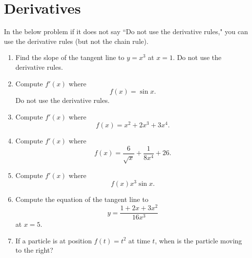 \documentclass[reqno,12pt,letterpaper]{amsart}
\theoremstyle{definition}
\numberwithin{equation}{section}
\begin{document}
\section{Derivatives}
In the below problem if it does not say ``Do not use the derivative rules," you can use the derivative rules (but not the chain rule).
\begin{enumerate}
\item Find the slope of the tangent line to $y = x^3$ at $x = 1$. Do not use the derivative rules.
\item Compute $f'(x)$ where
$$f(x) = \sin x.$$
Do not use the derivative rules.
\item Compute $f'(x)$ where
$$f(x) = x^2 + 2x^3 + 3x^4.$$
\item Compute $f'(x)$ where
$$f(x) = \frac{6}{\sqrt x} + \frac{1}{8x^4} + 26.$$
\item Compute $f'(x)$ where
$$f(x) x^3 \sin x.$$
\item Compute the equation of the tangent line to
$$y = \frac{1 + 2x + 3x^2}{16x^3}$$
at $x = 5$.
\item If a particle is at position $f(t) = t^2$ at time $t$, when is the particle moving to the right?
\end{enumerate}


\printbibliography
\end{document}
